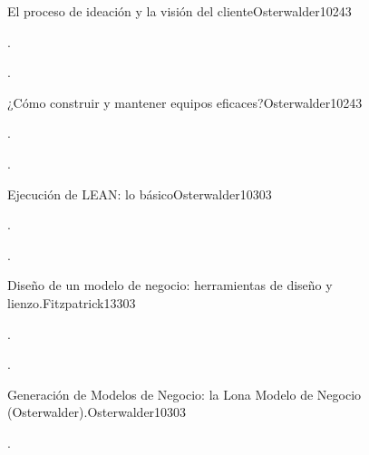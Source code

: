 \begin{syllabus}
\begin{unit}{El proceso de ideación y la visión del cliente}{}{Osterwalder10}{24}{3}
   \begin{topics}
      \item . 
   \end{topics}

   \begin{learningoutcomes}
      \item .
      \end{learningoutcomes}
\end{unit}

\begin{unit}{¿Cómo construir y mantener equipos eficaces?}{}{Osterwalder10}{24}{3}
   \begin{topics}
      \item . 
      \end{topics}

   \begin{learningoutcomes}
      \item .
   \end{learningoutcomes}
\end{unit}

\begin{unit}{Ejecución de LEAN: lo básico}{}{Osterwalder10}{30}{3}
   \begin{topics}
      \item .
   \end{topics}

   \begin{learningoutcomes}
      \item . 
   \end{learningoutcomes}
\end{unit}

\begin{unit}{Diseño de un modelo de negocio: herramientas de diseño y lienzo.}{}{Fitzpatrick13}{30}{3}
   \begin{topics}
      \item .
   \end{topics}

   \begin{learningoutcomes}
      \item .
   \end{learningoutcomes}
\end{unit}

\begin{unit}{Generación de Modelos de Negocio: la Lona Modelo de Negocio (Osterwalder).}{}{Osterwalder10}{30}{3}
   \begin{topics}
      \item . 
   \end{topics}


\end{unit}
\end{syllabus}
